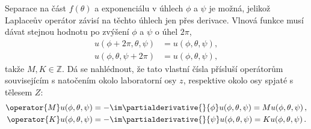 \begin{solution}
\begin{enumerate}
		Separace na část $f(\theta)$ a exponenciálu v úhlech $\phi$ a $\psi$ je možná, 
		jelikož Laplaceův operátor závisí na těchto úhlech jen přes derivace.
		Vlnová funkce musí dávat stejnou hodnotu po zvýšení $\phi$ a $\psi$ o úhel $2\pi$,
		\begin{subequations}
			\begin{align}
				u(\phi+2\pi,\theta,\psi)&=u(\phi,\theta,\psi),\\
				u(\phi,\theta,\psi+2\pi)&=u(\phi,\theta,\psi),
			\end{align}				
		\end{subequations}
		takže $M,K\in\mathbb{Z}$.
		Dá se nahlédnout, že tato vlastní čísla přísluší operátorům souvisejícím 
		s natočením okolo laboratorní osy $z$, respektive okolo osy spjaté s tělesem $Z$:
		\begin{subequations}
			\begin{align}
				\operator{M}u(\phi,\theta,\psi)&=-\im\partialderivative{}{\phi}u(\phi,\theta,\psi)=Mu(\phi,\theta,\psi)\,,\\
				\operator{K}u(\phi,\theta,\psi)&=-\im\partialderivative{}{\psi}u(\phi,\theta,\psi)=Ku(\phi,\theta,\psi)\,.
			\end{align}				
		\end{subequations}
		

\end{enumerate}
\end{solution}
